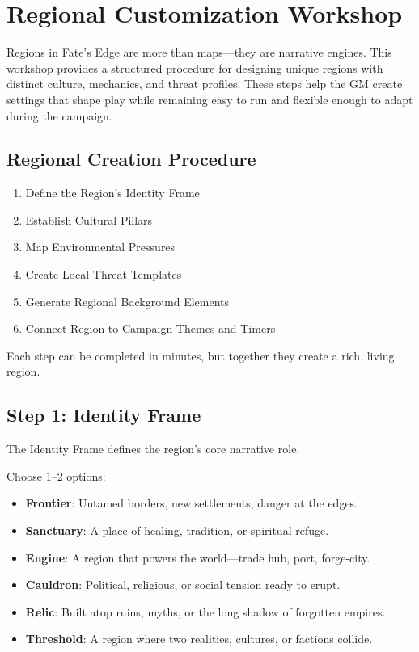 \documentclass[11pt]{article}
\begin{document}
\section{Regional Customization Workshop}
\label{sec:regional-customization}

Regions in Fate's Edge are more than maps---they are narrative engines. This workshop provides 
a structured procedure for designing unique regions with distinct culture, mechanics, and 
threat profiles. These steps help the GM create settings that shape play while remaining easy 
to run and flexible enough to adapt during the campaign.

\subsection{Regional Creation Procedure}

\begin{enumerate}
    \item Define the Region's Identity Frame
    \item Establish Cultural Pillars
    \item Map Environmental Pressures
    \item Create Local Threat Templates
    \item Generate Regional Background Elements
    \item Connect Region to Campaign Themes and Timers
\end{enumerate}

Each step can be completed in minutes, but together they create a rich, living region.

\subsection{Step 1: Identity Frame}
The Identity Frame defines the region's core narrative role.

Choose 1--2 options:

\begin{itemize}
    \item \textbf{Frontier}: Untamed borders, new settlements, danger at the edges.
    \item \textbf{Sanctuary}: A place of healing, tradition, or spiritual refuge.
    \item \textbf{Engine}: A region that powers the world---trade hub, port, forge-city.
    \item \textbf{Cauldron}: Political, religious, or social tension ready to erupt.
    \item \textbf{Relic}: Built atop ruins, myths, or the long shadow of forgotten empires.
    \item \textbf{Threshold}: A region where two realities, cultures, or factions collide.
\end{itemize}
\end{document}
